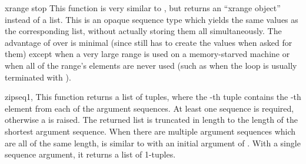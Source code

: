 \begin{funcdesc}{xrange}{ stop}
  This function is very similar to , but returns an
  ``xrange object'' instead of a list.  This is an opaque sequence
  type which yields the same values as the corresponding list, without
  actually storing them all simultaneously.  The advantage of
   over  is minimal (since
   still has to create the values when asked for
  them) except when a very large range is used on a memory-starved
  machine or when all of the range's elements are never used (such as
  when the loop is usually terminated with ).
\end{funcdesc}

\begin{funcdesc}{zip}{seq1, \moreargs}
  This function returns a list of tuples, where the -th tuple contains
  the -th element from each of the argument sequences.  At
  least one sequence is required, otherwise a  is
  raised.  The returned list is truncated in length to the length of
  the shortest argument sequence.  When there are multiple argument
  sequences which are all of the same length,  is
  similar to  with an initial argument of .
  With a single sequence argument, it returns a list of 1-tuples.
\end{funcdesc}
